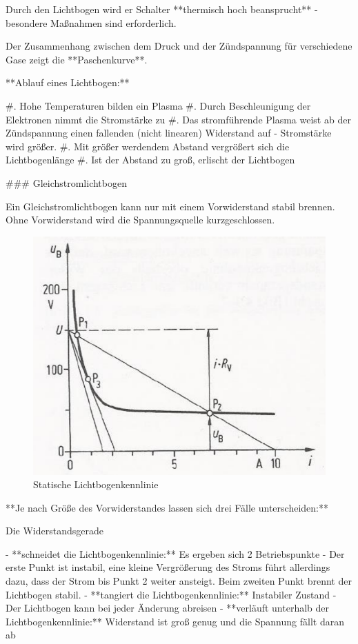 \begin{markdown}
Durch den Lichtbogen wird er Schalter **thermisch hoch beansprucht** - besondere Maßnahmen sind erforderlich. 

Der Zusammenhang zwischen dem Druck und der Zündspannung für verschiedene Gase zeigt die **Paschenkurve**.

**Ablauf eines Lichtbogen:**

#. Hohe Temperaturen bilden ein Plasma
#. Durch Beschleunigung der Elektronen nimmt die Stromstärke zu
#. Das stromführende Plasma weist ab der Zündspannung einen fallenden (nicht linearen) Widerstand auf - Stromstärke wird größer.
#. Mit größer werdendem Abstand vergrößert sich die Lichtbogenlänge
#. Ist der Abstand zu groß, erlischt der Lichtbogen

### Gleichstromlichtbogen

Ein Gleichstromlichtbogen kann nur mit einem Vorwiderstand stabil brennen. Ohne Vorwiderstand wird die Spannungsquelle kurzgeschlossen.

\begin{figure}
    \centering
    \includegraphics[width=\linewidth]{./images/10-Schaltanlagen/Lichtbogenkennlinie-Statisch.png}
    \caption[Statische Lichtbogenkennlinie]{Statische Lichtbogenkennlinie}
\end{figure}

**Je nach Größe des Vorwiderstandes lassen sich drei Fälle unterscheiden:**

Die Widerstandsgerade

- **schneidet die Lichtbogenkennlinie:** Es ergeben sich 2 Betriebspunkte - Der erste Punkt ist instabil, eine kleine Vergrößerung des Stroms führt allerdings dazu, dass der Strom bis Punkt 2 weiter ansteigt. Beim zweiten Punkt brennt der Lichtbogen stabil.  
- **tangiert die Lichtbogenkennlinie:** Instabiler Zustand - Der Lichtbogen kann bei jeder Änderung abreisen
- **verläuft unterhalb der Lichtbogenkennlinie:** Widerstand ist groß genug und die Spannung fällt daran ab


\end{markdown}
